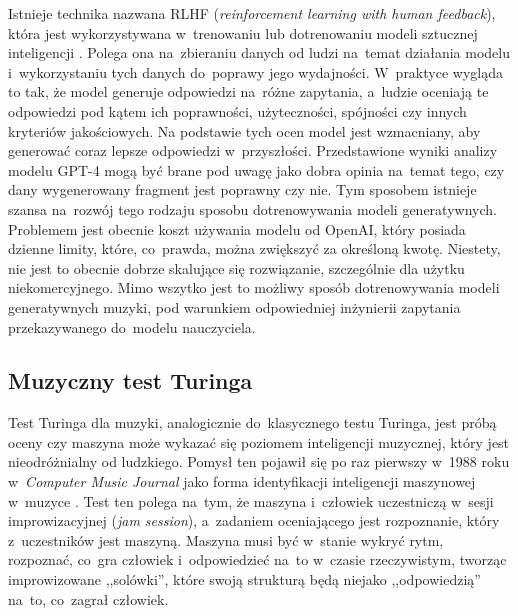 \documentclass[data-science]{agh-wi} %
\begin{document}
Istnieje technika nazwana RLHF (\textit{reinforcement learning with human feedback}), która jest wykorzystywana w~trenowaniu lub dotrenowaniu modeli sztucznej inteligencji \cite{rl_training}. Polega ona na~zbieraniu danych od ludzi na~temat działania modelu i~wykorzystaniu tych danych do~poprawy jego wydajności. W~praktyce wygląda to tak, że model generuje odpowiedzi na~różne zapytania, a~ludzie oceniają te odpowiedzi pod kątem ich poprawności, użyteczności, spójności czy innych kryteriów jakościowych. Na podstawie tych ocen model jest wzmacniany, aby generować coraz lepsze odpowiedzi w~przyszłości. Przedstawione wyniki analizy modelu GPT-4 mogą być brane pod uwagę jako dobra opinia na~temat tego, czy dany wygenerowany fragment jest poprawny czy nie. Tym sposobem istnieje szansa na~rozwój tego rodzaju sposobu dotrenowywania modeli generatywnych. Problemem jest obecnie koszt używania modelu od OpenAI, który posiada dzienne limity, które, co~prawda, można zwiększyć za określoną kwotę. Niestety, nie jest to obecnie dobrze skalujące się rozwiązanie, szczególnie dla użytku niekomercyjnego. Mimo wszytko jest to możliwy sposób dotrenowywania modeli generatywnych muzyki, pod warunkiem odpowiedniej inżynierii zapytania przekazywanego do~modelu nauczyciela.

\subsection{Muzyczny test Turinga}
Test Turinga dla muzyki, analogicznie do~klasycznego testu Turinga, jest próbą oceny czy maszyna może wykazać się poziomem inteligencji muzycznej, który jest nieodróżnialny od ludzkiego. Pomysł ten pojawił się po raz pierwszy w~1988 roku w~\textit{Computer Music Journal} jako forma identyfikacji inteligencji maszynowej w~muzyce \cite{music_turing_test}. Test ten polega na~tym, że maszyna i~człowiek uczestniczą w~sesji improwizacyjnej (\textit{jam session}), a~zadaniem oceniającego jest rozpoznanie, który z~uczestników jest maszyną. Maszyna musi być w~stanie wykryć rytm, rozpoznać, co~gra człowiek i~odpowiedzieć na~to w~czasie rzeczywistym, tworząc improwizowane ,,solówki'', które swoją strukturą będą niejako ,,odpowiedzią'' na~to, co~zagrał człowiek.
\end{document}
